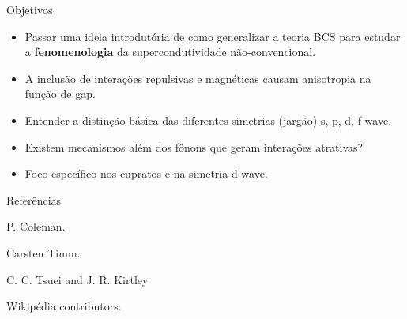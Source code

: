 \documentclass[10pt,aspectratio=169,xcolor={table,dvipsnames,usenames}]{beamer}
\begin{document}
\begin{frame}{Objetivos}

\begin{itemize}
\item Passar uma ideia introdutória de como generalizar a teoria BCS para estudar a \textbf{fenomenologia} da supercondutividade não-convencional.

\n\n

\item A inclusão de interações repulsivas e magnéticas causam anisotropia na função de gap.

\n\n

\item Entender a distinção básica das diferentes simetrias (jargão) s, p, d, f-wave.

\n\n

\item Existem mecanismos além dos fônons que geram interações atrativas?

\n\n

\item Foco específico nos cupratos e na simetria d-wave.
\end{itemize}

\end{frame}



\begin{frame}{Referências}

\footnotesize

\begin{thebibliography}{10}
\alert{P. Coleman.}

\alert{Carsten Timm.}

\alert{C. C. Tsuei and J. R. Kirtley}

\alert{Wikipédia contributors.}

\end{thebibliography}


\end{frame}
\end{document}
